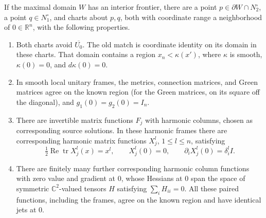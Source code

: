 \begin{proposition}\label{bdy:contact}
If the maximal domain \(W\) has an interior frontier, there are a
point \(p\in\partial W\cap N_2^\circ\), a point \(q\in N_1^\circ\),
and charts about \(p,q\), both with coordinate range a neighborhood
of \(0\in\mathbb R^n\), with the following properties.
\begin{enumerate}
\item Both charts avoid \(\overline{U_0}\).  The old match is
coordinate identity on its domain in these charts.  That domain
contains a region \(x_n<\kappa(x')\), where \(\kappa\) is smooth,
\(\kappa(0)=0\), and \(d\kappa(0)=0\).
\item In smooth local unitary frames, the metrics, connection
matrices, and Green matrices agree on the known region (for the
Green matrices, on its square off the diagonal), and
\(g_1(0)=g_2(0)=I_n\).
\item There are invertible matrix functions \(F_j\) with harmonic
columns, chosen as corresponding source solutions.  In these
harmonic frames there are corresponding harmonic matrix functions
\(X_j^l\), \(1\le l\le n\), satisfying
\begin{equation}\label{bdy:trace-coordinates}
 \tfrac12\operatorname{Re}\operatorname{tr}X_j^l(x)=x^l,
 \qquad X_j^l(0)=0,
 \qquad \partial_iX_j^l(0)=\delta_i^l I.
\end{equation}
\item There are finitely many further corresponding harmonic
column functions with zero value and gradient at \(0\), whose
Hessians at \(0\) span the space of symmetric
\(\mathbb C^2\)-valued tensors \(H\) satisfying
\(\sum_i H_{ii}=0\).  All these paired functions, including the
frames, agree on the known region and have identical jets at
\(0\).
\end{enumerate}
\end{proposition}


